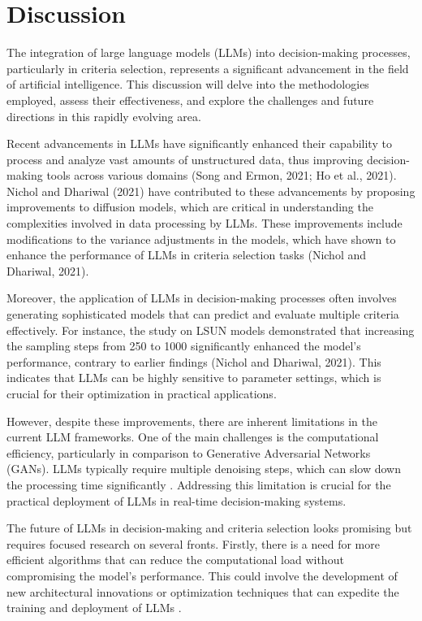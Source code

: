 \documentclass[conference]{IEEEtran}
\begin{document}
\section{Discussion}

The integration of large language models (LLMs) into decision-making processes, particularly in criteria selection, represents a significant advancement in the field of artificial intelligence. This discussion will delve into the methodologies employed, assess their effectiveness, and explore the challenges and future directions in this rapidly evolving area.

Recent advancements in LLMs have significantly enhanced their capability to process and analyze vast amounts of unstructured data, thus improving decision-making tools across various domains (Song and Ermon, 2021; Ho et al., 2021). Nichol and Dhariwal (2021) have contributed to these advancements by proposing improvements to diffusion models, which are critical in understanding the complexities involved in data processing by LLMs. These improvements include modifications to the variance adjustments in the models, which have shown to enhance the performance of LLMs in criteria selection tasks (Nichol and Dhariwal, 2021).

Moreover, the application of LLMs in decision-making processes often involves generating sophisticated models that can predict and evaluate multiple criteria effectively. For instance, the study on LSUN models demonstrated that increasing the sampling steps from 250 to 1000 significantly enhanced the model's performance, contrary to earlier findings (Nichol and Dhariwal, 2021). This indicates that LLMs can be highly sensitive to parameter settings, which is crucial for their optimization in practical applications.

However, despite these improvements, there are inherent limitations in the current LLM frameworks. One of the main challenges is the computational efficiency, particularly in comparison to Generative Adversarial Networks (GANs). LLMs typically require multiple denoising steps, which can slow down the processing time significantly \cite{luhm2021}. Addressing this limitation is crucial for the practical deployment of LLMs in real-time decision-making systems.

The future of LLMs in decision-making and criteria selection looks promising but requires focused research on several fronts. Firstly, there is a need for more efficient algorithms that can reduce the computational load without compromising the model's performance. This could involve the development of new architectural innovations or optimization techniques that can expedite the training and deployment of LLMs \cite{luhm2021}.
\end{document}

